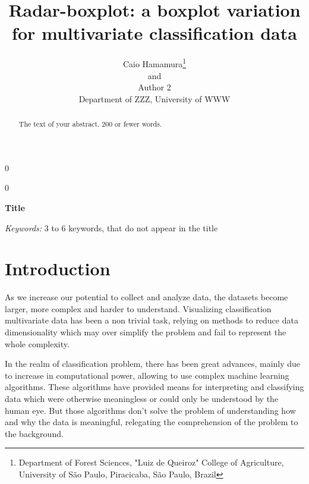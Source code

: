 \documentclass[12pt]{article}
\newcommand{\blind}{0}
\newcommand{\thetitle}{%
Radar-boxplot: a boxplot variation for multivariate classification data%
}
\begin{document}
%

\def\spacingset#1{\renewcommand{\baselinestretch}%
{#1}\small\normalsize} \spacingset{1}



\blind
{
  \title{\bf \thetitle}
\author{Caio Hamamura\thanks{
    Department of Forest Sciences, "Luiz de Queiroz" College of Agriculture, University of S\~ao Paulo, Piracicaba, S\~ao Paulo, Brazil}\hspace{.2cm}\\
    and \\
    Author 2 \\
    Department of ZZZ, University of WWW}
  \maketitle
} \fi
\blind
{
  \bigskip
  \bigskip
  \bigskip
  \begin{center}
    {\LARGE\bf Title}
\end{center}
  \medskip
} \fi

\bigskip
\begin{abstract}
  The text of your abstract.  200 or fewer words.
\end{abstract}
\noindent%
{\it Keywords:}  3 to 6 keywords, that do not appear in the title
\vfill

\newpage
\spacingset{1.45} %

\section{Introduction}
\label{sec:intro}
As we increase our potential to collect and analyze data, the datasets become larger, more complex and harder to understand. Visualizing classification multivariate data has been a non trivial task, relying on methods to reduce data dimensionality which may over simplify the problem and fail to represent the whole complexity. 

In the realm of classification problem, there has been great advances, mainly due to increase in computational power, allowing to use complex machine learning algorithms. These algorithms have provided means for interpreting and classifying data which were otherwise meaningless or could only be understood by the human eye. But those algorithms don't solve the problem of understanding how and why the data is meaningful, relegating the comprehension of the problem to the background. 
\end{document}
